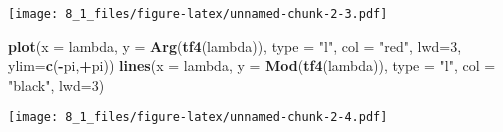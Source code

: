 \documentclass[]{article}
\newenvironment{Shaded}{\begin{snugshade}}{\end{snugshade}}
\newcommand{\KeywordTok}[1]{\textcolor[rgb]{0.13,0.29,0.53}{\textbf{#1}}}
\newcommand{\DataTypeTok}[1]{\textcolor[rgb]{0.13,0.29,0.53}{#1}}
\newcommand{\DecValTok}[1]{\textcolor[rgb]{0.00,0.00,0.81}{#1}}
\newcommand{\StringTok}[1]{\textcolor[rgb]{0.31,0.60,0.02}{#1}}
\newcommand{\OperatorTok}[1]{\textcolor[rgb]{0.81,0.36,0.00}{\textbf{#1}}}
\newcommand{\NormalTok}[1]{#1}
\begin{document}
\texttt{[image: 8\_1\_files/figure-latex/unnamed-chunk-2-3.pdf]}

\begin{Shaded}
\begin{Highlighting}[]
\KeywordTok{plot}\NormalTok{(}\DataTypeTok{x =}\NormalTok{ lambda, }\DataTypeTok{y =} \KeywordTok{Arg}\NormalTok{(}\KeywordTok{tf4}\NormalTok{(lambda)), }\DataTypeTok{type =} \StringTok{"l"}\NormalTok{, }\DataTypeTok{col =} \StringTok{"red"}\NormalTok{, }\DataTypeTok{lwd=}\DecValTok{3}\NormalTok{, }\DataTypeTok{ylim=}\KeywordTok{c}\NormalTok{(}\OperatorTok{-}\NormalTok{pi,}\OperatorTok{+}\NormalTok{pi))}
\KeywordTok{lines}\NormalTok{(}\DataTypeTok{x =}\NormalTok{ lambda, }\DataTypeTok{y =} \KeywordTok{Mod}\NormalTok{(}\KeywordTok{tf4}\NormalTok{(lambda)), }\DataTypeTok{type =} \StringTok{"l"}\NormalTok{, }\DataTypeTok{col =} \StringTok{"black"}\NormalTok{, }\DataTypeTok{lwd=}\DecValTok{3}\NormalTok{)}
\end{Highlighting}
\end{Shaded}

\texttt{[image: 8\_1\_files/figure-latex/unnamed-chunk-2-4.pdf]}
\end{document}

